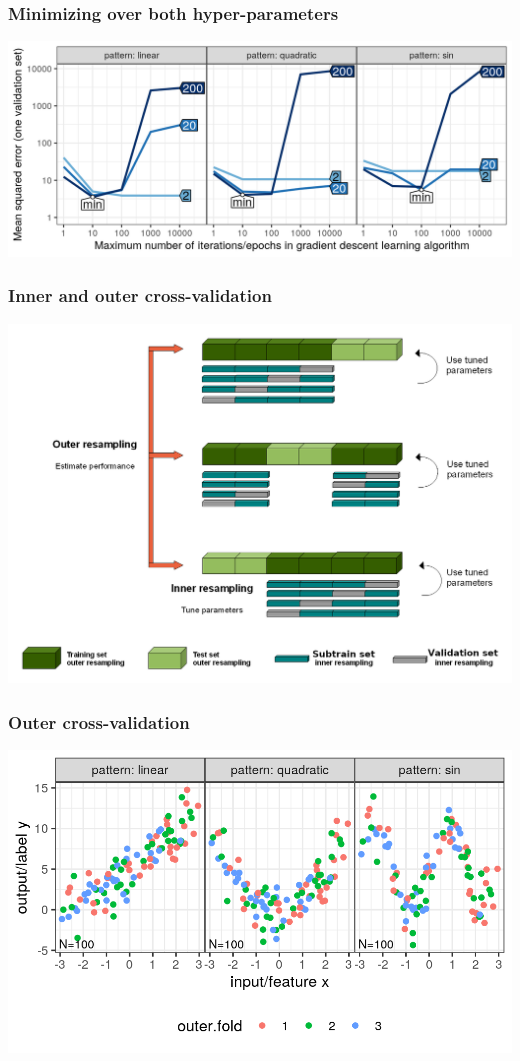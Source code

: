 \documentclass{beamer}
\begin{document}
\begin{frame}
  \frametitle{Minimizing over both hyper-parameters}

  \includegraphics[width=\textwidth]{figure-overfitting-validation-only}
  
\end{frame}

\begin{frame}
  \frametitle{Inner and outer cross-validation}

  \includegraphics[width=\textwidth]{nested_resampling}
  
\end{frame}

\begin{frame}
  \frametitle{Outer cross-validation}

  \includegraphics[width=\textwidth]{figure-overfitting-cv-data-outer-folds}
  
\end{frame}
\end{document}
